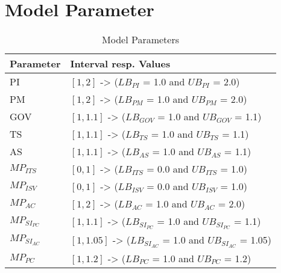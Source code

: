 \section{Model Parameter}
\begin{table}[tbh]
	\centering
	\begin{tabular}{ll}
			\toprule 
			Parameter & Interval resp. Values\\ \midrule
			PI & $[1,2]$ -> ($LB_{PI}$ = 1.0 and $UB_{PI}$ = 2.0) \\ 
			PM & $[1,2]$ -> ($LB_{PM}$ = 1.0 and $UB_{PM}$ = 2.0) \\ \midrule
			GOV & $[1,1.1]$ -> ($LB_{GOV}$ = 1.0 and $UB_{GOV}$ = 1.1) \\
			TS & $[1,1.1]$ -> ($LB_{TS}$ = 1.0 and $UB_{TS}$ = 1.1) \\
			AS & $[1,1.1]$ -> ($LB_{AS}$ = 1.0 and $UB_{AS}$ = 1.1) \\ \midrule
			$MP_{ITS}$ & $[0,1]$ -> ($LB_{ITS}$ = 0.0 and $UB_{ITS}$ = 1.0) \\
			$MP_{ISV}$ & $[0,1]$ -> ($LB_{ISV}$ = 0.0 and $UB_{ISV}$ = 1.0) \\
			$MP_{AC}$ & $[1,2]$ -> ($LB_{AC}$ = 1.0 and $UB_{AC}$ = 2.0) \\
			$MP_{SI_{PC}}$ & $[1,1.1]$ -> ($LB_{SI_{PC}}$ = 1.0 and $UB_{SI_{PC}}$ = 1.1) \\
			$MP_{SI_{AC}}$ & $[1,1.05]$ -> ($LB_{SI_{AC}}$ = 1.0 and $UB_{SI_{AC}}$ = 1.05) \\
			$MP_{PC}$ & $[1,1.2]$ -> ($LB_{PC}$ = 1.0 and $UB_{PC}$ = 1.2) \\ \bottomrule
	\end{tabular}
	\caption{Model Parameters}
	\label{tab:mpara}
\end{table}

\newpage
